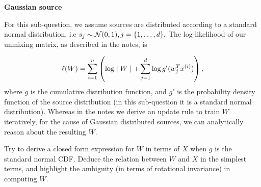 \item {} \textbf{Gaussian source}

For this sub-question, we assume sources are distributed according to a standard normal distribution, i.e $s_j \sim \mathcal{N}(0,1), j=\{1,\ldots,{d}\}.$ The log-likelihood of our unmixing matrix, as described in the notes, is

$$\ell(W) = \sum_{i=1}^{n}\left(\log\mid W\mid + \sum_{j=1}^{d} \log g'(w_j^Tx^{(i)})\right),$$ where $g$ is the cumulative distribution function, and $g'$ is the probability density function of the source distribution (in this sub-question it is a standard normal distribution). Whereas in the notes we derive an update rule to train $W$ iteratively, for the cause of Gaussian distributed sources, we can analytically reason about the resulting $W$.

Try to derive a closed form expression for $W$ in terms of $X$ when $g$ is the standard normal CDF. Deduce the relation between $W$ and $X$ in the simplest terms, and highlight the ambiguity (in terms of rotational invariance) in computing $W$.

